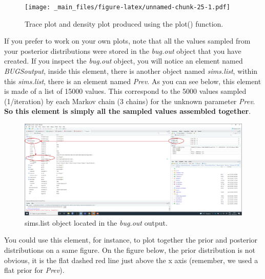 \documentclass[
]{book}
\begin{document}
\begin{figure}
\centering
\texttt{[image: \_main\_files/figure-latex/unnamed-chunk-25-1.pdf]}
\caption{Trace plot and density plot produced using the plot()
function.}
\end{figure}

If you prefer to work on your own plots, note that all the values
sampled from your posterior distributions were stored in the
\emph{bug.out} object that you have created. If you inspect the
\emph{bug.out} object, you will notice an element named
\emph{BUGSoutput}, inside this element, there is another object named
\emph{sims.list}, within this \emph{sims.list}, there is an element
named \emph{Prev}. As you can see below, this element is made of a list
of 15000 values. This correspond to the 5000 values sampled
(1/iteration) by each Markov chain (3 chains) for the unknown parameter
\emph{Prev}. \textbf{So this element is simply all the sampled values
assembled together}.

\begin{figure}
\centering
\includegraphics{Figures/sims list.png}
\caption{sims.list object located in the \emph{bug.out} output.}
\end{figure}

You could use this element, for instance, to plot together the prior and
posterior distributions on a same figure. On the figure below, the prior
distribution is not obvious, it is the flat dashed red line just above
the x axis (remember, we used a flat prior for \emph{Prev}).
\end{document}
